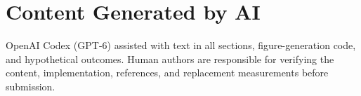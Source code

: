 \documentclass[conference,9pt,letterpaper]{IEEEtran}
\begin{document}
\section*{Content Generated by AI}
OpenAI Codex (GPT-6) assisted with text in all sections, figure-generation code, and hypothetical outcomes. Human authors are responsible for verifying the content, implementation, references, and replacement measurements before submission.

\clearpage
{}


\end{document}
